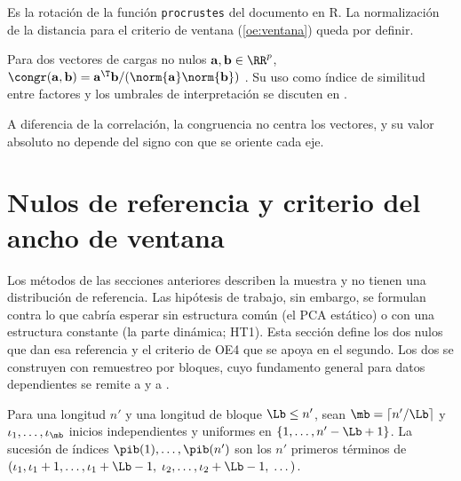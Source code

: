 Es la rotación de la función \texttt{procrustes} del documento en R. La normalización de la
distancia para el criterio de ventana (\cref{oe:ventana}) queda por definir.

\begin{definicion}\label{def:tucker}
Para dos vectores de cargas no nulos $\mathbf{a},\mathbf{b}\in\RR^{p}$,
$\congr(\mathbf{a},\mathbf{b})=\mathbf{a}^{\T}\mathbf{b}/(\norm{\mathbf{a}}\norm{\mathbf{b}})$
\parencite{tucker_1951}. Su uso como índice de
similitud entre factores y los umbrales de interpretación se discuten en
\textcite{lorenzo_seva_ten_berge_2006}.
\end{definicion}

A diferencia de la correlación, la congruencia no centra los vectores, y su valor absoluto no
depende del signo con que se oriente cada eje.

\section{Nulos de referencia y criterio del ancho de ventana}
\label{sec:nulos}

Los métodos de las secciones anteriores describen la muestra y no tienen una distribución de
referencia. Las hipótesis de trabajo, sin embargo, se formulan contra lo que cabría esperar sin
estructura común (el PCA estático) o con una estructura constante (la parte dinámica; HT1). Esta
sección define los dos nulos que dan esa referencia y el criterio de OE4 que se apoya en el
segundo. Los dos se construyen con remuestreo por bloques, cuyo fundamento general para datos
dependientes se remite a \textcite{kunsch_1989} y a
\textcite{lahiri_2003}.

\begin{definicion}\label{def:bloques}
Para una longitud $n'$ y una longitud de bloque $\Lb\le n'$, sean $\mb=\lceil n'/\Lb\rceil$ y
$\iota_1,\dots,\iota_{\mb}$ inicios independientes y uniformes en $\{1,\dots,n'-\Lb+1\}$. La sucesión de
índices $\pib(1),\dots,\pib(n')$ son los $n'$ primeros términos de
$(\iota_1,\iota_1+1,\dots,\iota_1+\Lb-1,\;\iota_2,\dots,\iota_2+\Lb-1,\;\dots)$.
\end{definicion}

